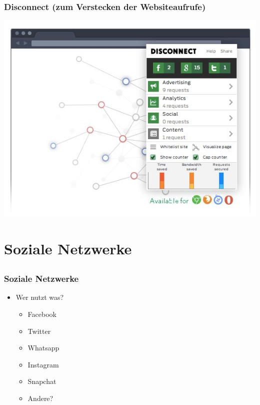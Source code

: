 \documentclass[12pt]{beamer}
\begin{document}
\begin{frame}
  \frametitle{Disconnect (zum Verstecken der Websiteaufrufe)}
  \begin{center}
    \includegraphics[height=0.7\textheight]{img/disconnectme.jpg}
  \end{center}
\end{frame}

\section{Soziale Netzwerke}
\subsection{}

\begin{frame}
  \frametitle{Soziale Netzwerke}
  \begin{itemize}
    \item Wer nutzt was?
      \begin{itemize}
        \item<2-> Facebook
        \item<3-> Twitter
        \item<4-> Whatsapp
        \item<5-> Instagram
        \item<6-> Snapchat
        \item<7-> Andere?
      \end{itemize}
  \end{itemize}
\end{frame}
\end{document}
